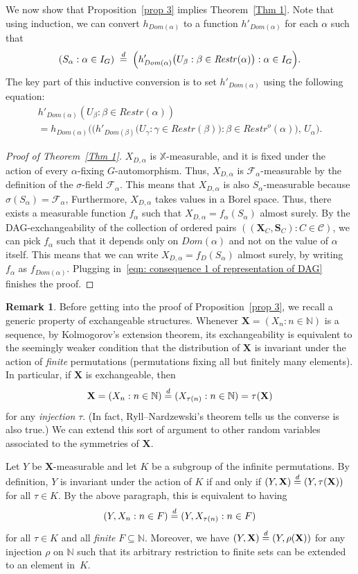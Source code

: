 \documentclass[10pt]{amsart}
\theoremstyle{definition}\newtheorem{defi}[theo]{Definition}\newtheorem{rema}[theo]{Remark}\newtheorem{exam}[theo]{Example}\newtheorem{exem}[theo]{Example}\newtheorem{nota}[theo]{Notation}
\newcommand{\alf}{\alpha}%
\newcommand*\bb{\beta}
\renewcommand{\d}{\buildrel{d}\over{=}}
\newcommand*\rstr{\mathit{Restr}}
\newcommand*\srstr{\mathit{Restr}^o}
\newcommand*\dom{\mathit{Dom}}
\newcommand*\X{\mathbb{X}}
\newcommand*\N{\mathbb{N}}
\newcommand*\CC{{\mathcal{C}}}
\newcommand*\FF{\mathcal{F}}
\newcommand*\bS{\mathbf{S}}
\newcommand*\bX{\mathbf{X}}
\newtheorem{remark}[theo]{Remark}\NewDocumentEnvironment{enonce*}{ O{} m O{} }{\par\smallskip\noindent\textbf{#2\if\relax\detokenize{#3}\relax\else\ (#3)\fi.}\ }{\par\smallskip}
\begin{document}
We now show that Proposition~\ref{prop 3} implies Theorem~\ref{Thm 1}. Note that using induction, we can convert $h_{\dom(\alf)}$ to a function $h'_{\dom(\alf)}$ for each $\alf$ such that
\begin{equation}\label{eqn: consequence 1 of representation of DAG}
(S_\alf : \alf \in I_G) \;\d\; \Big(h'_{\dom(\alf)}\big(U_\bb : \bb\in \rstr(\alf)\big) : \alf \in I_G\Big).
\end{equation}
The key part of this inductive conversion is to set $h'_{\dom(\alf)}$ using the following equation:
\begin{multline*}
h'_{\dom(\alf)}(U_\bb : \bb \in \rstr(\alf)) \\
= h_{\dom(\alf)}\Bigg(\Big(h'_{\dom(\bb)}\big(U_{\gamma} : \gamma \in \rstr(\bb)\big) : \bb \in \srstr(\alf)\Big),\, U_\alf \Bigg).
\end{multline*}
\begin{proof}[Proof of Theorem~\ref{Thm 1}] $X_{D,\alf}$ is $\X$-measurable, and it is fixed under the action of every $\alf$-fixing $G$-automorphism. Thus, $X_{D,\alf}$ is $\FF_\alf$-measurable by the definition of the $\sigma$-field $\FF_\alf$. This means that $X_{D,\alf}$ is also $S_\alf$-measurable because $\sigma(S_\alf) = \FF_\alf$,
Furthermore, $X_{D,\alf}$ takes values in a Borel space. Thus, there exists a measurable function $f_\alf$ such that $X_{D,\alf} = f_\alf(S_\alf)$ almost surely. By the DAG-exchangeability of the collection of ordered pairs $((\bX_C,\bS_C) : C \in \CC)$, we can pick $f_\alf$ such that it depends only on $\dom(\alf)$ and not on the value of $\alf$ itself. This means that we can write $X_{D,\alf} = f_{D}(S_\alf)$ almost surely, by writing $f_\alpha$ as $f_{\dom(\alf)}$. Plugging in~\eqref{eqn: consequence 1 of representation of DAG} finishes the proof.
\end{proof}

\begin{remark}
Before getting into the proof of Proposition~\ref{prop 3}, we recall a generic property of exchangeable structures. Whenever $\bX =(X_n : n \in \N)$ is a sequence, by Kolmogorov's extension theorem, its exchangeability is equivalent to the seemingly weaker condition that the distribution of $\bX$ is invariant under the action of \emph{finite} permutations (permutations fixing all but finitely many elements). In particular, if $\bX$ is exchangeable, then
\[
\bX = (X_n : n \in \N) \d (X_{\tau(n)} : n \in \N) = \tau(\bX)
\]
for any \emph{injection} $\tau$. (In fact, Ryll--Nardzewski's theorem tells us the converse is also true.) We can extend this sort of argument to other random variables associated to the symmetries of $\bX$.

Let $Y$ be $\bX$-measurable and let $K$ be a subgroup of the infinite permutations. By definition, $Y$ is invariant under the action of $K$ if and only if $(Y, \bX) \d (Y, \tau(\bX))$ for all $\tau \in K$. By the above paragraph, this is equivalent to having
\[
(Y, X_n : n \in F) \d (Y, X_{\tau(n)}: n \in F)
\]
for all $\tau \in K$ and all \emph{finite} $F \subseteq \N$. Moreover, we have $(Y,\bX)\d(Y,\rho(\bX))$ for any injection $\rho$ on $\N$ such that its arbitrary restriction to finite sets can be extended to an element in~$K$.
\end{remark}
\end{document}
